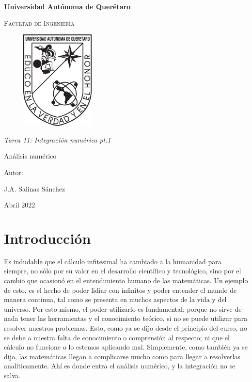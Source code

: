 \documentclass[12pt,oneside,FLEQN]{report}
\begin{document}
{
\selectfont
	\BgThispage
\begin{titlepage}
        \topmargin=1cm
        \centering

        {\bfseries\LARGE Universidad Autónoma de Querétaro \par}
        \vspace{1cm}
        {\scshape\Large  Facultad de Ingenier\'ia  \par}
        \vspace{3cm}
        \begin{figure}[!h]
        	\centering
                \includegraphics[height=5cm]{Logouaq.png}
        \end{figure}
        \vspace{2cm}
        {\itshape\large Tarea 11: Integración numérica pt.1\par}
        \vspace{3cm}
        {\Huge Análisis numérico\par}
        \vspace{2cm}
        {\Large Autor: \par}
        {\large J.A. Salinas Sánchez \par}
        {\large Abril 2022 \par}
\end{titlepage}
	\clearpage
	\newpage
\tableofcontents
\chapter{Introducción}
	Es indudable que el cálculo infitesimal ha cambiado a la humanidad para siempre, no sólo por su valor en el desarrollo científico y tecnológico, sino por el cambio que ocasionó en el entendimiento humano de las matemáticas. Un ejemplo de esto, es el hecho de poder lidiar con infinitos y poder entender el mundo de manera continua, tal como se presenta en muchos aspectos de la vida y del universo. Por esto mismo, el poder utilizarlo es fundamental; porque no sirve de nada tener las herramientas y el conocimiento teórico, si no se puede utilizar para resolver nuestros problemas. Esto, como ya se dijo desde el principio del curso, no se debe a nuestra falta de conocimiento o comprensión al respecto; ni que el cálculo no funcione o lo estemos aplicando mal. Simplemente, como también ya se dijo, las matemáticas llegan a complicarse mucho como para llegar a resolverlas analíticamente. Ahí es donde entra el análisis numérico, y la integración no se salva.\\

}
\end{document}
